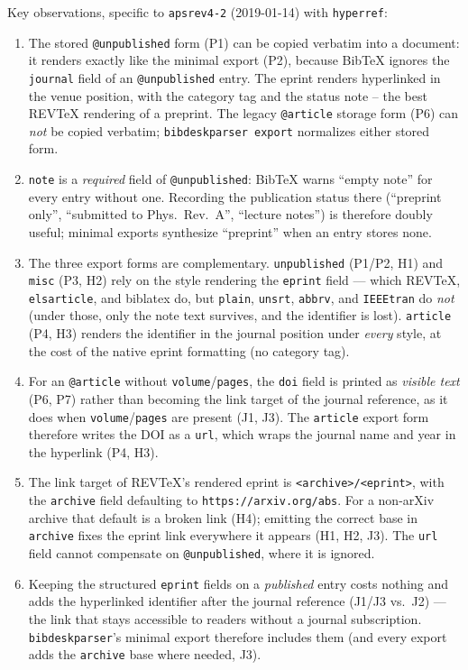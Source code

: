 \documentclass[onecolumn, amsmath, amssymb, aps, pra]{revtex4-2}
\begin{document}
Key observations, specific to \texttt{apsrev4-2} (2019-01-14) with
\texttt{hyperref}:

\begin{enumerate}
\item The stored \texttt{@unpublished} form (P1) can be copied verbatim
  into a document: it renders exactly like the minimal export (P2),
  because BibTeX ignores the \texttt{journal} field of an
  \texttt{@unpublished} entry. The eprint renders hyperlinked in the
  venue position, with the category tag and the status note -- the best
  REVTeX rendering of a preprint. The legacy \texttt{@article} storage
  form (P6) can \emph{not} be copied verbatim; \texttt{bibdeskparser
  export} normalizes either stored form.
\item \texttt{note} is a \emph{required} field of \texttt{@unpublished}:
  BibTeX warns ``empty note'' for every entry without one. Recording the
  publication status there (``preprint only'', ``submitted to Phys.\
  Rev.\ A'', ``lecture notes'') is therefore doubly useful; minimal
  exports synthesize ``preprint'' when an entry stores none.
\item The three export forms are complementary. \texttt{unpublished}
  (P1/P2, H1) and \texttt{misc} (P3, H2) rely on the style rendering the
  \texttt{eprint} field --- which REVTeX, \texttt{elsarticle}, and
  biblatex do, but \texttt{plain}, \texttt{unsrt}, \texttt{abbrv}, and
  \texttt{IEEEtran} do \emph{not} (under those, only the note text
  survives, and the identifier is lost). \texttt{article} (P4, H3)
  renders the identifier in the journal position under \emph{every}
  style, at the cost of the native eprint formatting (no category tag).
\item For an \texttt{@article} without \texttt{volume}/\texttt{pages},
  the \texttt{doi} field is printed as \emph{visible text} (P6, P7)
  rather than becoming the link target of the journal reference, as it
  does when \texttt{volume}/\texttt{pages} are present (J1, J3). The
  \texttt{article} export form therefore writes the DOI as a
  \texttt{url}, which wraps the journal name and year in the hyperlink
  (P4, H3).
\item The link target of REVTeX's rendered eprint is
  \texttt{<archive>/<eprint>}, with the \texttt{archive} field
  defaulting to \texttt{https://arxiv.org/abs}. For a non-arXiv archive
  that default is a broken link (H4); emitting the correct base in
  \texttt{archive} fixes the eprint link everywhere it appears (H1, H2,
  J3). The \texttt{url} field cannot compensate on
  \texttt{@unpublished}, where it is ignored.
\item Keeping the structured \texttt{eprint} fields on a
  \emph{published} entry costs nothing and adds the hyperlinked
  identifier after the journal reference (J1/J3 vs.\ J2) --- the link
  that stays accessible to readers without a journal subscription.
  \texttt{bibdeskparser}'s minimal export therefore includes them
  (and every export adds the \texttt{archive} base where needed, J3).
\end{enumerate}


\end{document}
